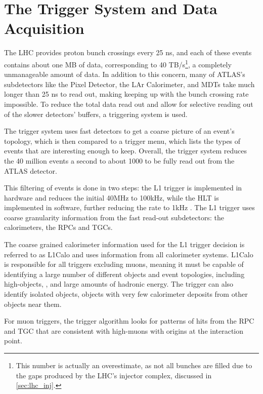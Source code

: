 \section{The Trigger System and Data Acquisition}
\label{sec:Trigger}

The \ac{LHC} provides proton bunch crossings every 25 ns, and each of these events contains about one MB of data, corresponding to 40 TB/s\footnote{ This number is actually an overestimate, as not all bunches are filled due to the gaps produced by the \ac{LHC}'s injector complex, discussed in \autoref{sec:lhc_inj}.}, a completely unmanageable amount of data. In addition to this concern, many of \ac{ATLAS}'s subdetectors like the Pixel Detector, the LAr Calorimeter, and \acp{MDT} take much longer than 25 ns to read out, making keeping up with the bunch crossing rate impossible. To reduce the total data read out and allow for selective reading out of the slower detectors' buffers, a triggering system is used. 

The trigger system uses fast detectors to get a coarse picture of an event's topology, which is then compared to a trigger menu, which lists the types of events that are interesting enough to keep. Overall, the trigger system reduces the 40 million events a second to about 1000 to be fully read out from the \ac{ATLAS} detector. 

This filtering of events is done in two steps: the \ac{L1} trigger is implemented in hardware and reduces the initial 40MHz to 100kHz, while the \ac{HLT} is implemented in software, further reducing the rate to 1kHz \cite{ATL-DAQ-PUB-2016-001}. The \ac{L1} trigger uses coarse granularity information from the fast read-out subdetectors: the calorimeters, the \acp{RPC} and \acp{TGC}. 

The coarse grained calorimeter information used for the \ac{L1} trigger decision is referred to as \ac{L1Calo} and uses information from all calorimeter systems. \ac{L1Calo} is responsible for all triggers excluding muons, meaning it must be capable of identifying a large number of different objects and event topologies, including high-\pt objects, \met, and large amounts of hadronic energy. The trigger can also identify isolated objects, objects with very few calorimeter deposits from other objects near them.

For muon triggers, the trigger algorithm looks for patterns of hits from the \ac{RPC} and \ac{TGC} that are consistent with high-\pt muons with origins at the interaction point. 

